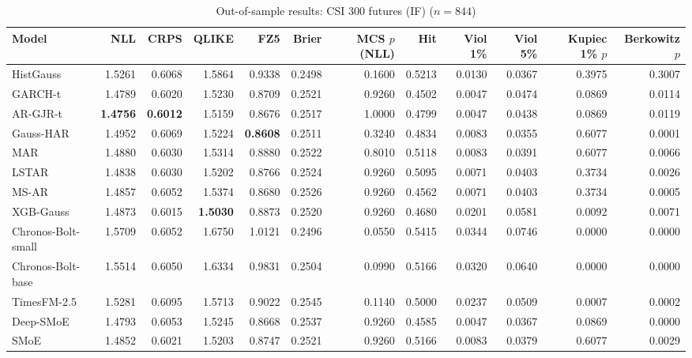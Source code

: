 \begin{table}[!htbp]\centering\scriptsize
\caption{Out-of-sample results: CSI 300 futures (IF) ($n=844$)}\label{tab:asset_if_main}
\begin{adjustbox}{max width=\textwidth}
\begin{tabular}{lrrrrrrrrrrr}
\toprule
Model & NLL & CRPS & QLIKE & FZ5 & Brier & MCS $p$ (NLL) & Hit & Viol 1\% & Viol 5\% & Kupiec 1\% $p$ & Berkowitz $p$\\
\midrule
HistGauss & 1.5261 & 0.6068 & 1.5864 & 0.9338 & 0.2498 & 0.1600 & 0.5213 & 0.0130 & 0.0367 & 0.3975 & 0.3007\\
GARCH-t & 1.4789 & 0.6020 & 1.5230 & 0.8709 & 0.2521 & 0.9260 & 0.4502 & 0.0047 & 0.0474 & 0.0869 & 0.0114\\
AR-GJR-t & \textbf{1.4756} & \textbf{0.6012} & 1.5159 & 0.8676 & 0.2517 & 1.0000 & 0.4799 & 0.0047 & 0.0438 & 0.0869 & 0.0119\\
Gauss-HAR & 1.4952 & 0.6069 & 1.5224 & \textbf{0.8608} & 0.2511 & 0.3240 & 0.4834 & 0.0083 & 0.0355 & 0.6077 & 0.0001\\
MAR & 1.4880 & 0.6030 & 1.5314 & 0.8880 & 0.2522 & 0.8010 & 0.5118 & 0.0083 & 0.0391 & 0.6077 & 0.0066\\
LSTAR & 1.4838 & 0.6030 & 1.5202 & 0.8766 & 0.2524 & 0.9260 & 0.5095 & 0.0071 & 0.0403 & 0.3734 & 0.0026\\
MS-AR & 1.4857 & 0.6052 & 1.5374 & 0.8680 & 0.2526 & 0.9260 & 0.4562 & 0.0071 & 0.0403 & 0.3734 & 0.0005\\
XGB-Gauss & 1.4873 & 0.6015 & \textbf{1.5030} & 0.8873 & 0.2520 & 0.9260 & 0.4680 & 0.0201 & 0.0581 & 0.0092 & 0.0071\\
Chronos-Bolt-small & 1.5709 & 0.6052 & 1.6750 & 1.0121 & 0.2496 & 0.0550 & 0.5415 & 0.0344 & 0.0746 & 0.0000 & 0.0000\\
Chronos-Bolt-base & 1.5514 & 0.6050 & 1.6334 & 0.9831 & 0.2504 & 0.0990 & 0.5166 & 0.0320 & 0.0640 & 0.0000 & 0.0000\\
TimesFM-2.5 & 1.5281 & 0.6095 & 1.5713 & 0.9022 & 0.2545 & 0.1140 & 0.5000 & 0.0237 & 0.0509 & 0.0007 & 0.0002\\
Deep-SMoE & 1.4793 & 0.6053 & 1.5245 & 0.8668 & 0.2537 & 0.9260 & 0.4585 & 0.0047 & 0.0367 & 0.0869 & 0.0000\\
SMoE & 1.4852 & 0.6021 & 1.5203 & 0.8747 & 0.2521 & 0.9260 & 0.5166 & 0.0083 & 0.0379 & 0.6077 & 0.0029\\
\bottomrule
\end{tabular}
\end{adjustbox}
\end{table}